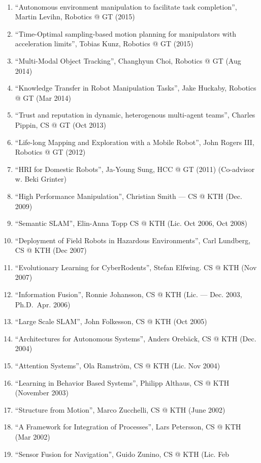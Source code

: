 \documentclass{article}
\begin{document}
\begin{cv}
\begin{cvlist}{~}
\begin{enumerate}
			\item ``Autonomous environment manipulation to facilitate task completion'',
			      Martin Levihn, Robotics @ GT (2015)
			\item ``Time-Optimal sampling-based motion planning for manipulators with
			      acceleration limits'', Tobias Kunz, Robotics @ GT (2015)
			\item ``Multi-Modal Object Tracking'', Changhyun Choi, Robotics @ GT (Aug
			      2014)
			\item ``Knowledge Transfer in Robot Manipulation Tasks'', Jake Huckaby,
			      Robotics @ GT (Mar 2014)
			\item ``Trust and reputation in dynamic, heterogenous multi-agent teams'',
			      Charles Pippin, CS @ GT (Oct 2013)
			\item ``Life-long Mapping and Exploration with a Mobile Robot'', John Rogers
			      III, Robotics @ GT (2012)
			\item ``HRI for Domestic Robots'', Ja-Young Sung, HCC @ GT (2011)
			      (Co-advisor w. Beki Grinter)
			\item ``High Performance Manipulation'', Christian Smith --- CS @ KTH (Dec.
			      2009)
			\item ``Semantic SLAM'', Elin-Anna Topp CS @ KTH (Lic. Oct 2006, Oct 2008)
			\item ``Deployment of Field Robots in Hazardous Environments'', Carl
			      Lundberg, CS @ KTH (Dec 2007)
			\item ``Evolutionary Learning for CyberRodents'', Stefan Elfwing. CS @ KTH
			      (Nov 2007)
			\item ``Information Fusion'', Ronnie Johansson, CS @ KTH (Lic. --- Dec. 2003,
			      Ph.D.\ Apr. 2006)
			\item ``Large Scale SLAM'', John Folkesson, CS @ KTH (Oct 2005)
			\item ``Architectures for Autonomous Systems'', Anders Oreb{\"a}ck, CS @ KTH
			      (Dec. 2004)
			\item ``Attention Systems'', Ola Ramstr\"om, CS @ KTH (Lic. Nov 2004)
			\item ``Learning in Behavior Based Systems'', Philipp Althaus, CS @ KTH
			      (November 2003)
			\item ``Structure from Motion'', Marco Zucchelli, CS @ KTH (June 2002)
			\item ``A Framework for Integration of Processes'', Lars Petersson, CS @ KTH
			      (Mar 2002)
			\item ``Sensor Fusion for Navigation'', Guido Zunino, CS @ KTH (Lic. Feb

\end{enumerate}
\end{cvlist}
\end{cv}
\end{document}
